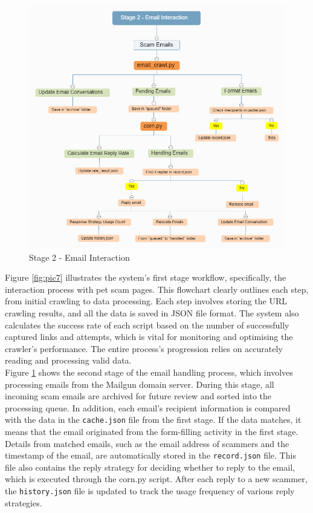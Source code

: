 \documentclass[ oneside,%
                    author={Cassie Qing Tang},
                    degree={BSc},
                     title={An Automated Response System for Disrupting Online Pet Scamming \\ },
                    subtitle={ }]{dissertation}
\begin{document}
\begin{figure}[H]
\centering
\includegraphics[width=0.8\linewidth]{pic/figure8.png}
\caption{Stage 2 - Email Interaction}
\label{fig:pic8}
\end{figure}

Figure \ref{fig:pic7} illustrates the system's first stage workflow, specifically, the interaction process with pet scam pages. This flowchart clearly outlines each step, from initial crawling to data processing. Each step involves storing the URL crawling results, and all the data is saved in JSON file format. The system also calculates the success rate of each script based on the number of successfully captured links and attempts, which is vital for monitoring and optimising the crawler's performance. The entire process's progression relies on accurately reading and processing valid data.
\\

Figure \ref{fig:pic8} shows the second stage of the email handling process, which involves processing emails from the Mailgun domain server. During this stage, all incoming scam emails are archived for future review and sorted into the processing queue. In addition, each email's recipient information is compared with the data in the \texttt{cache.json} file from the first stage. If the data matches, it means that the email originated from the form-filling activity in the first stage. Details from matched emails, such as the email address of scammers and the timestamp of the email, are automatically stored in the \texttt{record.json} file. This file also contains the reply strategy for deciding whether to reply to the email, which is executed through the corn.py script. After each reply to a new scammer, the \texttt{history.json} file is updated to track the usage frequency of various reply strategies.
\\
\end{document}
